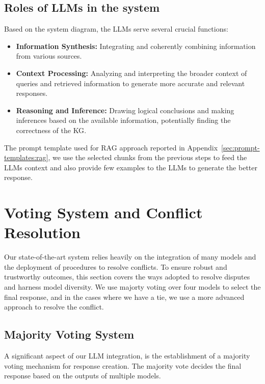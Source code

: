 \subsection{Roles of LLMs in the system}\label{subsec:roles-of-llms-in-the-system}
Based on the system diagram, the LLMs serve several crucial functions:
\begin{itemize}
    \item \textbf{Information Synthesis:} Integrating and coherently combining information from various sources.
    \item \textbf{Context Processing:} Analyzing and interpreting the broader context of queries and retrieved information to generate more accurate and relevant responses.
    \item \textbf{Reasoning and Inference:} Drawing logical conclusions and making inferences based on the available information, potentially finding the correctness of the \ac{KG}.
\end{itemize}

The prompt template used for RAG approach reported in Appendix~\ref{sec:prompt-templates:rag}, we use the selected chunks from the previous steps to feed the LLMs context and also provide few examples to the LLMs to generate the better response.

\section{Voting System and Conflict Resolution}\label{sec:model-diversity-and-conflict-resolution}
Our state-of-the-art system relies heavily on the integration of many models and the deployment of procedures to resolve conflicts.
To ensure robust and trustworthy outcomes, this section covers the ways adopted to resolve disputes and harness model diversity.
We use majorty voting over four models to select the final response, and in the cases where we have a tie, we use a more advanced approach to resolve the conflict.

\subsection{Majority Voting System}\label{subsec:majority-voting-system}
A significant aspect of our LLM integration, is the establishment of a majority voting mechanism for response creation.
The majority vote decides the final response based on the outputs of multiple models.

